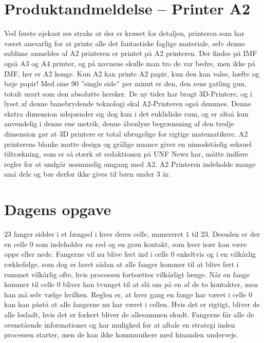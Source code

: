 \begin{minipage}[t]{100mm}
\vspace{1mm}
\section*{Produktandmeldelse -- Printer A2}
Ved første øjekast ses straks at der er kræset for detaljen, printeren som har været ansvarlig for at printe alle det fantastiske faglige materiale, selv denne sublime anmeldes af A2 printeren er printet på A2 printeren.  Der findes på IMF også A3 og A4 printer, og på navnene skulle man tro de var bedre, men ikke på IMF, her er A2 konge. Kun A2 kan printe A2 papir, kun den kan valse, hæfte og bøje papir! Med sine 90 ”single side” per minut er den, den rene gatling gun, totalt urørt som den absolutte hersker. De ny tider har bragt 3D-Printere, og i lyset af denne banebrydende teknologi skal A2-Printeren også dømmes. Denne ekstra dimension udspænder sig dog kun i det euklidiske rum, og er altså kun anvendelig i denne ene metrik, denne åbenlyse begrænsning af den tredje dimension gør at 3D printere er total ubrugelige for rigtige matematikere.  A2 printerens blanke matte design og grålige nuance giver en uimodståelig seksuel tiltrækning, som er så stærk at redaktionen på UNF Newz har, måtte indføre regler for at undgår usømmelig omgang med A2. 
A2 Printeren indeholde mange små dele og bør derfor ikke gives til børn under 3 år.

\vspace{1mm}
\section*{Dagens opgave}
$23$ fanger sidder i et fængsel i hver deres celle, numereret $1$ til $23$. Desuden er der en celle $0$ som indeholder en rød og en grøn kontakt, som hver især kan være oppe eller nede. Fangerne vil nu blive ført ind i celle $0$ enkeltvis og i en vilkårlig rækkefølge, som dog er lavet sådan at alle fanger kommer til at blive ført i rummet vilkårlig ofte, hvis processen fortsættes vilkårligt længe. Når en fange kommer til celle $0$ bliver han tvunget til at slå om på en af de to kontakter, men han må selv vælge hvilken. Reglen er, at hver gang en fange har været i celle $0$ kan han påstå at alle fangerne nu har været i cellen. Hvis det er rigtigt, bliver de alle løsladt, hvis det er forkert bliver de allesammen skudt. Fangerne får alle de ovenstående informationer og har mulighed for at aftale en strategi inden processen starter, men de kan ikke kommunikere med hinanden undervejs.


\end{minipage}
